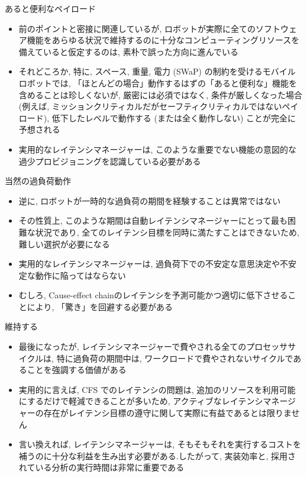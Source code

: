 \begin{frame}{あると便利なペイロード}
    \begin{itemize}
        \item 前のポイントと密接に関連しているが, ロボットが実際に全てのソフトウェア機能をあらゆる状況で維持するのに十分なコンピューティングリソースを備えていると仮定するのは, 素朴で誤った方向に進んでいる
\item それどころか, 特に, スペース, 重量, 電力 (SWaP) の制約を受けるモバイルロボットでは, 「ほとんどの場合」動作するはずの「あると便利な」機能を含めることは珍しくないが, 厳密には必須ではなく, 条件が厳しくなった場合 (例えば, ミッションクリティカルだがセーフティクリティカルではないペイロード), 低下したレベルで動作する (または全く動作しない) ことが完全に予想される
\item 実用的なレイテンシマネージャーは, このような重要でない機能の意図的な過少プロビジョニングを認識している必要がある
    \end{itemize}
\end{frame}

\begin{frame}{当然の過負荷動作}
    \begin{itemize}
        \item 逆に, ロボットが一時的な過負荷の期間を経験することは異常ではない
\item その性質上, このような期間は自動レイテンシマネージャーにとって最も困難な状況であり, 全てのレイテンシ目標を同時に満たすことはできないため, 難しい選択が必要になる
\item 実用的なレイテンシマネージャーは, 過負荷下での不安定な意思決定や不安定な動作に陥ってはならない
\item むしろ, Cause-effect chainのレイテンシを予測可能かつ適切に低下させることにより, 「驚き」を回避する必要がある
    \end{itemize}
\end{frame}

\begin{frame}{維持する}
    \begin{itemize}
        \item 最後になったが, レイテンシマネージャーで費やされる全てのプロセッササイクルは, 特に過負荷の期間中は, ワークロードで費やされないサイクルであることを強調する価値がある
\item 実用的に言えば, CFS でのレイテンシの問題は, 追加のリソースを利用可能にするだけで軽減できることが多いため, アクティブなレイテンシマネージャーの存在がレイテンシ目標の遵守に関して実際に有益であるとは限りません
\item 言い換えれば, レイテンシマネージャーは, そもそもそれを実行するコストを補うのに十分な利益を生み出す必要がある.したがって, 実装効率と, 採用されている分析の実行時間は非常に重要である
    \end{itemize}
\end{frame}

